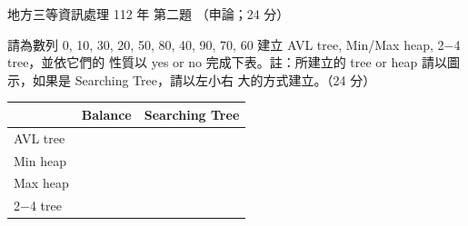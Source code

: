 \begin{pastexam}[label={px:df3-112-ds-02}]{地方三等資訊處理 112 年 第二題}
（申論；24 分）

請為數列 0, 10, 30, 20, 50, 80, 40, 90, 70, 60 建立 AVL tree, Min/Max heap, 2$-$4 tree，並依它們的
性質以 yes or no 完成下表。註：所建立的 tree or heap 請以圖示，如果是 Searching Tree，請以左小右
大的方式建立。（24 分）
\begin{center}
\begin{tabular}{|l|c|c|}
\hline
 & Balance & Searching Tree \\ \hline
AVL tree & & \\ \hline
Min heap & & \\ \hline
Max heap & & \\ \hline
2$-$4 tree & & \\ \hline
\end{tabular}
\end{center}
\end{pastexam}


